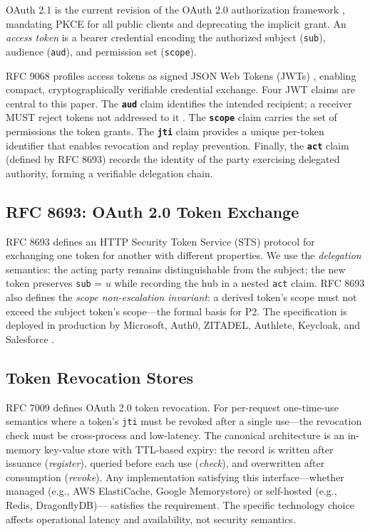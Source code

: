 \documentclass[journal]{IEEEtran}
\begin{document}
OAuth 2.1 \cite{oauth21} is the current revision of the OAuth 2.0 authorization
framework \cite{rfc6749}, mandating PKCE for all public clients and deprecating
the implicit grant. An \textit{access token} is a bearer credential encoding the
authorized subject (\texttt{sub}), audience (\texttt{aud}), and permission set
(\texttt{scope}).

RFC 9068 \cite{rfc9068} profiles access tokens as signed JSON Web Tokens
(JWTs) \cite{rfc7519}, enabling compact, cryptographically verifiable
credential exchange. Four JWT claims are central to this paper.
The \textbf{\texttt{aud}} claim identifies the intended recipient; a receiver
MUST reject tokens not addressed to it \cite{rfc9068}.
The \textbf{\texttt{scope}} claim carries the set of permissions the token grants.
The \textbf{\texttt{jti}} claim provides a unique per-token identifier that
enables revocation and replay prevention.
Finally, the \textbf{\texttt{act}} claim (defined by RFC 8693) records the
identity of the party exercising delegated authority, forming a verifiable
delegation chain.

\subsection{RFC 8693: OAuth 2.0 Token Exchange}

RFC 8693 \cite{rfc8693} defines an HTTP Security Token Service (STS) protocol
for exchanging one token for another with different properties.
We use the \textit{delegation} semantics: the acting party remains
distinguishable from the subject; the new token preserves \texttt{sub} = $u$
while recording the hub in a nested \texttt{act} claim. RFC 8693 also defines
the \textit{scope non-escalation invariant}: a derived token's scope must not
exceed the subject token's scope---the formal basis for P2. The specification
is deployed in production by Microsoft, Auth0, ZITADEL, Authlete, Keycloak,
and Salesforce \cite{rfc8693_deploy}.

\subsection{Token Revocation Stores}

RFC 7009 \cite{rfc7009} defines OAuth 2.0 token revocation. For per-request
one-time-use semantics where a token's \texttt{jti} must be revoked after a
single use---the revocation check must be cross-process and low-latency. The
canonical architecture is an in-memory key-value store with TTL-based expiry:
the record is written after issuance (\textit{register}), queried before each
use (\textit{check}), and overwritten after consumption (\textit{revoke}). Any
implementation satisfying this interface---whether managed (e.g., AWS
ElastiCache, Google Memorystore) or self-hosted (e.g., Redis, DragonflyDB)---
satisfies the requirement. The specific technology choice affects operational
latency and availability, not security semantics.
\end{document}
